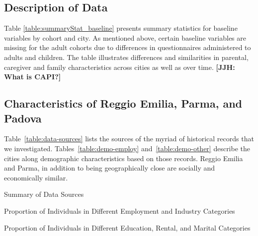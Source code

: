 \subsection{Description of Data}

Table \ref{table:summaryStat_baseline} presents summary statistics for baseline variables by cohort and city. As mentioned above, certain baseline variables are missing for the adult cohorts due to differences in questionnaires administered to adults and children. The table illustrates differences and similarities in parental, caregiver and family characteristics across cities as well as over time. \textbf{[JJH: What is CAPI?]}

\begin{landscape}

\end{landscape}

\subsection{Characteristics of Reggio Emilia, Parma, and Padova}
\label{app:characteristics-cities}

Table~\ref{table:data-sources} lists the sources of the myriad of historical records that we investigated. Tables~\ref{table:demo-employ} and~\ref{table:demo-other} describe the cities along demographic characteristics based on those records. Reggio Emilia and Parma, in addition to being geographically close are socially and economically similar.

\begin{table}[H]
\centering
\footnotesize
	\caption{Summary of Data Sources} \label{table:data-sources}
	
\end{table}


\begin{landscape}
\begin{table}[ht!]
\begin{center}
\scriptsize{
	\caption{Proportion of Individuals in Different Employment and Industry Categories} \label{table:demo-employ}
	
}
\end{center}
\end{table}
\end{landscape}

\begin{landscape}
\begin{table}[ht!]
\begin{center}
\scriptsize{
	\caption{Proportion of Individuals in Different Education, Rental, and Marital Categories} \label{table:demo-other}
	
}
\end{center}
\end{table}
\end{landscape}


